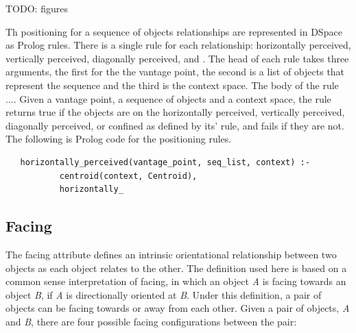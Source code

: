\documentclass[12pt]{ucthesis}
\begin{document}
TODO: figures

Th positioning for a sequence of objects relationships are represented in DSpace as Prolog rules. There is a single rule for each relationship: horizontally perceived, vertically perceived, diagonally perceived, and . The head of each rule takes three arguments, the first for the the vantage point, the second is a list of objects that represent the sequence and the third is the context space. The body of the rule .... Given a vantage point, a sequence of objects and a context space, the rule returns true if the objects are on the horizontally perceived, vertically perceived, diagonally perceived, or confined as defined by its' rule, and fails if they are not. The following is Prolog code for the positioning rules.
\begin{verbatim}
   horizontally_perceived(vantage_point, seq_list, context) :-
           centroid(context, Centroid),
           horizontally_
\end{verbatim}


\subsection{Facing}
The facing attribute defines an intrinsic orientational relationship between two objects as each object relates to the other. The definition used here is based on a common sense interpretation of facing, in which an object \emph{A} is facing towards an object \emph{B}, if \emph{A} is directionally oriented at \emph{B}. Under this definition, a pair of objects can be facing towards or away from each other. Given a pair of objects, \emph{A} and \emph{B}, there are four possible facing configurations between the pair: 
\end{document}
